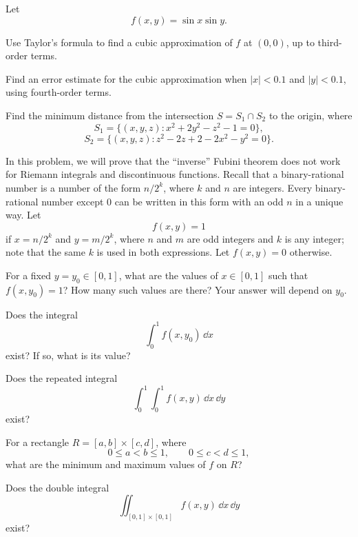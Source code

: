 \begin{problem}
Let
\[
f(x,y)=\sin x\sin y.
\]
\begin{problemsubparts}
\item Use Taylor's formula to find a cubic approximation of $f$ at $(0,0)$, up to third-order terms.
\item Find an error estimate for the cubic approximation when $|x|<0.1$ and $|y|<0.1$, using fourth-order terms.
\end{problemsubparts}
\end{problem}

\begin{problem}
Find the minimum distance from the intersection $S=S_1\cap S_2$ to the origin, where
\[
S_1=\{(x,y,z):x^2+2y^2-z^2-1=0\},
\]
\[
S_2=\{(x,y,z):z^2-2z+2-2x^2-y^2=0\}.
\]
\end{problem}

\begin{problem}
In this problem, we will prove that the ``inverse'' Fubini theorem does not work for Riemann integrals and discontinuous functions. Recall that a binary-rational number is a number of the form $n/2^k$, where $k$ and $n$ are integers. Every binary-rational number except $0$ can be written in this form with an odd $n$ in a unique way. Let
\[
f(x,y)=1
\]
if $x=n/2^k$ and $y=m/2^k$, where $n$ and $m$ are odd integers and $k$ is any integer; note that the same $k$ is used in both expressions. Let $f(x,y)=0$ otherwise.
\begin{problemsubparts}
\item For a fixed $y=y_0\in[0,1]$, what are the values of $x\in[0,1]$ such that $f(x,y_0)=1$? How many such values are there? Your answer will depend on $y_0$.

Does the integral
\[
\int_0^1 f(x,y_0)\,\dd x
\]
exist? If so, what is its value?

Does the repeated integral
\[
\int_0^1\int_0^1 f(x,y)\,\dd x\,\dd y
\]
exist?
\item For a rectangle $R=[a,b]\times[c,d]$, where
\[
0\le a<b\le1,
\qquad
0\le c<d\le1,
\]
what are the minimum and maximum values of $f$ on $R$?

Does the double integral
\[
\iint_{[0,1]\times[0,1]} f(x,y)\,\dd x\,\dd y
\]
exist?
\end{problemsubparts}
\end{problem}

